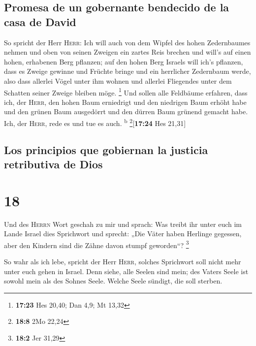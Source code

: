 \hypertarget{promesa-de-un-gobernante-bendecido-de-la-casa-de-david}{%
\subsection{Promesa de un gobernante bendecido de la casa de
David}\label{promesa-de-un-gobernante-bendecido-de-la-casa-de-david}}

 So spricht der Herr \textsc{Herr}: Ich will auch von dem
Wipfel des hohen Zedernbaumes nehmen und oben von seinen Zweigen ein
zartes Reis brechen und will's auf einen hohen, erhabenen Berg pflanzen;
 auf den hohen Berg Israels will ich's pflanzen, dass es
Zweige gewinne und Früchte bringe und ein herrlicher Zedernbaum werde,
also dass allerlei Vögel unter ihm wohnen und allerlei Fliegendes unter
dem Schatten seiner Zweige bleiben möge. \footnote{\textbf{17:23} Hes
  20,40; Dan 4,9; Mt 13,32}  Und sollen alle Feldbäume
erfahren, dass ich, der \textsc{Herr}, den hohen Baum erniedrigt und den
niedrigen Baum erhöht habe und den grünen Baum ausgedörrt und den dürren
Baum grünend gemacht habe. Ich, der \textsc{Herr}, rede es und tue es
auch. \textsuperscript{b} \footnote{\textbf{18:8} 2Mo 22,24}{[}\textbf{17:24}
Hes 21,31{]}

\hypertarget{los-principios-que-gobiernan-la-justicia-retributiva-de-dios}{%
\subsection{Los principios que gobiernan la justicia retributiva de
Dios}\label{los-principios-que-gobiernan-la-justicia-retributiva-de-dios}}

\hypertarget{section-17}{%
\section{18}\label{section-17}}

 Und des \textsc{Herrn} Wort geschah zu mir und sprach:
 Was treibt ihr unter euch im Lande Israel dies Sprichwort
und sprecht: „Die Väter haben Herlinge gegessen, aber den Kindern sind
die Zähne davon stumpf geworden``? \footnote{\textbf{18:2} Jer 31,29}

 So wahr als ich lebe, spricht der Herr \textsc{Herr},
solches Sprichwort soll nicht mehr unter euch gehen in Israel.
 Denn siehe, alle Seelen sind mein; des Vaters Seele ist
sowohl mein als des Sohnes Seele. Welche Seele sündigt, die soll
sterben.


